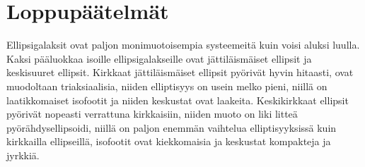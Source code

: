 \documentclass[12pt,a4paper]{article}
\begin{document}
%
%
%

\section{Loppupäätelmät}

Ellipsigalaksit ovat paljon monimuotoisempia systeemeitä kuin voisi aluksi luulla. Kaksi pääluokkaa isoille ellipsigalakseille ovat jättiläismäiset ellipsit ja keskisuuret ellipsit. Kirkkaat jättiläismäiset ellipsit pyörivät hyvin hitaasti, ovat muodoltaan triaksiaalisia, niiden elliptisyys on usein melko pieni, niillä on laatikkomaiset isofootit ja niiden keskustat ovat laakeita. Keskikirkkaat ellipsit pyörivät nopeasti verrattuna kirkkaisiin, niiden muoto on liki litteä pyörähdysellipsoidi, niillä on paljon enemmän vaihtelua elliptisyyksissä kuin kirkkailla ellipseillä, isofootit ovat kiekkomaisia ja keskustat kompakteja ja jyrkkiä.
\end{document}
